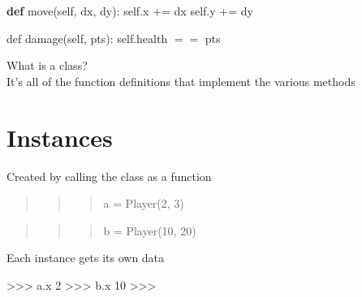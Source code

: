 \documentclass[
  letterpaper,
  DIV=11,
  numbers=noendperiod]{scrreprt}
\newenvironment{Shaded}{\begin{snugshade}}{\end{snugshade}}
\newcommand{\KeywordTok}[1]{\textcolor[rgb]{0.00,0.23,0.31}{\textbf{#1}}}
\newcommand{\NormalTok}[1]{\textcolor[rgb]{0.00,0.23,0.31}{#1}}
\newcommand{\OperatorTok}[1]{\textcolor[rgb]{0.37,0.37,0.37}{#1}}
\newcommand{\VariableTok}[1]{\textcolor[rgb]{0.07,0.07,0.07}{#1}}
\begin{document}
\begin{Shaded}
\begin{Highlighting}[]
\KeywordTok{def}\NormalTok{ move(}\VariableTok{self}\NormalTok{, dx, dy): }\VariableTok{self}\NormalTok{.x }\OperatorTok{+=}\NormalTok{ dx }\VariableTok{self}\NormalTok{.y }\OperatorTok{+=}\NormalTok{ dy }
\end{Highlighting}
\end{Shaded}

def damage(self, pts): self.health \(= =\) pts

What is a class?\\
It's all of the function definitions that implement the various methods


\chapter{Instances}\label{instances}

Created by calling the class as a function

\begin{quote}
\begin{quote}
\begin{quote}
a = Player(2, 3)
\end{quote}
\end{quote}
\end{quote}

\begin{quote}
\begin{quote}
\begin{quote}
b = Player(10, 20)
\end{quote}
\end{quote}
\end{quote}

\begin{quote}
\begin{quote}
\begin{quote}
\end{quote}
\end{quote}
\end{quote}

Each instance gets its own data

\begin{Shaded}
\begin{Highlighting}[]
\NormalTok{\textgreater{}\textgreater{}\textgreater{} a.x 2   }
\NormalTok{\textgreater{}\textgreater{}\textgreater{} b.x 10   }
\NormalTok{\textgreater{}\textgreater{}\textgreater{} }
\end{Highlighting}
\end{Shaded}
\end{document}
